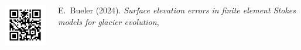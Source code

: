 
\begin{columns}
\begin{column}{0.22\textwidth}
\includegraphics[width=\textwidth]{figs/qrpreprint.png}
\end{column}
\begin{column}{0.78\textwidth}
E.~Bueler (2024). \emph{Surface elevation errors in finite element {S}tokes models for glacier evolution}, 
\end{column}
\end{columns}

\noindent \hrulefill

